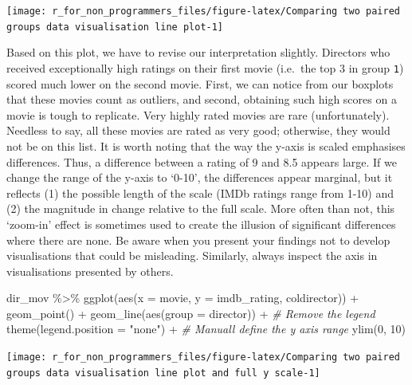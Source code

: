 \documentclass[
]{book}
\newenvironment{Shaded}{\begin{snugshade}}{\end{snugshade}}
\newcommand{\AttributeTok}[1]{\textcolor[rgb]{0.77,0.63,0.00}{#1}}
\newcommand{\CommentTok}[1]{\textcolor[rgb]{0.56,0.35,0.01}{\textit{#1}}}
\newcommand{\DecValTok}[1]{\textcolor[rgb]{0.00,0.00,0.81}{#1}}
\newcommand{\FunctionTok}[1]{\textcolor[rgb]{0.00,0.00,0.00}{#1}}
\newcommand{\NormalTok}[1]{#1}
\newcommand{\SpecialCharTok}[1]{\textcolor[rgb]{0.00,0.00,0.00}{#1}}
\newcommand{\StringTok}[1]{\textcolor[rgb]{0.31,0.60,0.02}{#1}}
\begin{document}
\begin{center}\texttt{[image: r\_for\_non\_programmers\_files/figure-latex/Comparing two paired groups data visualisation line plot-1]} \end{center}

Based on this plot, we have to revise our interpretation slightly. Directors who received exceptionally high ratings on their first movie (i.e.~the top 3 in group \texttt{1}) scored much lower on the second movie. First, we can notice from our boxplots that these movies count as outliers, and second, obtaining such high scores on a movie is tough to replicate. Very highly rated movies are rare (unfortunately). Needless to say, all these movies are rated as very good; otherwise, they would not be on this list. It is worth noting that the way the y-axis is scaled emphasises differences. Thus, a difference between a rating of 9 and 8.5 appears large. If we change the range of the y-axis to `0-10', the differences appear marginal, but it reflects (1) the possible length of the scale (IMDb ratings range from 1-10) and (2) the magnitude in change relative to the full scale. More often than not, this `zoom-in' effect is sometimes used to create the illusion of significant differences where there are none. Be aware when you present your findings not to develop visualisations that could be misleading. Similarly, always inspect the axis in visualisations presented by others.

\begin{Shaded}
\begin{Highlighting}[]
\NormalTok{dir\_mov }\SpecialCharTok{\%\textgreater{}\%}
  \FunctionTok{ggplot}\NormalTok{(}\FunctionTok{aes}\NormalTok{(}\AttributeTok{x =}\NormalTok{ movie, }\AttributeTok{y =}\NormalTok{ imdb\_rating, coldirector)) }\SpecialCharTok{+}
  \FunctionTok{geom\_point}\NormalTok{() }\SpecialCharTok{+}
  \FunctionTok{geom\_line}\NormalTok{(}\FunctionTok{aes}\NormalTok{(}\AttributeTok{group =}\NormalTok{ director)) }\SpecialCharTok{+}
  \CommentTok{\# Remove the legend}
  \FunctionTok{theme}\NormalTok{(}\AttributeTok{legend.position =} \StringTok{"none"}\NormalTok{) }\SpecialCharTok{+}
  \CommentTok{\# Manuall define the y axis range}
  \FunctionTok{ylim}\NormalTok{(}\DecValTok{0}\NormalTok{, }\DecValTok{10}\NormalTok{)}
\end{Highlighting}
\end{Shaded}

\begin{center}\texttt{[image: r\_for\_non\_programmers\_files/figure-latex/Comparing two paired groups data visualisation line plot and full y scale-1]} \end{center}
\end{document}
